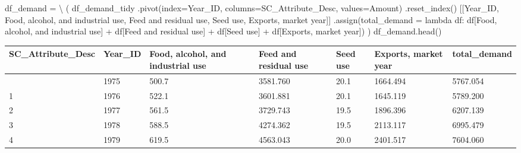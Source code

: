 \documentclass[
  letterpaper,
  DIV=11,
  numbers=noendperiod]{scrreprt}
\newenvironment{Shaded}{\begin{snugshade}}{\end{snugshade}}
\newcommand{\KeywordTok}[1]{\textcolor[rgb]{0.00,0.23,0.31}{#1}}
\newcommand{\NormalTok}[1]{\textcolor[rgb]{0.00,0.23,0.31}{#1}}
\newcommand{\OperatorTok}[1]{\textcolor[rgb]{0.37,0.37,0.37}{#1}}
\newcommand{\StringTok}[1]{\textcolor[rgb]{0.13,0.47,0.30}{#1}}
\begin{document}
\begin{Shaded}
\begin{Highlighting}[]
\NormalTok{df\_demand }\OperatorTok{=} \OperatorTok{\textbackslash{}}
\NormalTok{    (}
\NormalTok{    df\_demand\_tidy}
\NormalTok{        .pivot(index}\OperatorTok{=}\StringTok{\textquotesingle{}Year\_ID\textquotesingle{}}\NormalTok{, columns}\OperatorTok{=}\StringTok{\textquotesingle{}SC\_Attribute\_Desc\textquotesingle{}}\NormalTok{, values}\OperatorTok{=}\StringTok{\textquotesingle{}Amount\textquotesingle{}}\NormalTok{)}
\NormalTok{        .reset\_index()}
\NormalTok{        [[}\StringTok{\textquotesingle{}Year\_ID\textquotesingle{}}\NormalTok{, }\StringTok{\textquotesingle{}Food, alcohol, and industrial use\textquotesingle{}}\NormalTok{, }\StringTok{\textquotesingle{}Feed and residual use\textquotesingle{}}\NormalTok{, }\StringTok{\textquotesingle{}Seed use\textquotesingle{}}\NormalTok{, }\StringTok{\textquotesingle{}Exports, market year\textquotesingle{}}\NormalTok{]]}
\NormalTok{        .assign(total\_demand }\OperatorTok{=} \KeywordTok{lambda}\NormalTok{ df: df[}\StringTok{\textquotesingle{}Food, alcohol, and industrial use\textquotesingle{}}\NormalTok{] }\OperatorTok{+}\NormalTok{ df[}\StringTok{\textquotesingle{}Feed and residual use\textquotesingle{}}\NormalTok{] }\OperatorTok{+} 
\NormalTok{                df[}\StringTok{\textquotesingle{}Seed use\textquotesingle{}}\NormalTok{] }\OperatorTok{+}\NormalTok{ df[}\StringTok{\textquotesingle{}Exports, market year\textquotesingle{}}\NormalTok{])}
\NormalTok{    )}
\NormalTok{df\_demand.head()}
\end{Highlighting}
\end{Shaded}

\begin{longtable}[]{@{}lllllll@{}}
\toprule\noalign{}
SC\_Attribute\_Desc & Year\_ID & Food, alcohol, and industrial use &
Feed and residual use & Seed use & Exports, market year &
total\_demand \\
\midrule\noalign{}
\endhead
\bottomrule\noalign{}
\endlastfoot
0 & 1975 & 500.7 & 3581.760 & 20.1 & 1664.494 & 5767.054 \\
1 & 1976 & 522.1 & 3601.881 & 20.1 & 1645.119 & 5789.200 \\
2 & 1977 & 561.5 & 3729.743 & 19.5 & 1896.396 & 6207.139 \\
3 & 1978 & 588.5 & 4274.362 & 19.5 & 2113.117 & 6995.479 \\
4 & 1979 & 619.5 & 4563.043 & 20.0 & 2401.517 & 7604.060 \\
\end{longtable}
\end{document}
